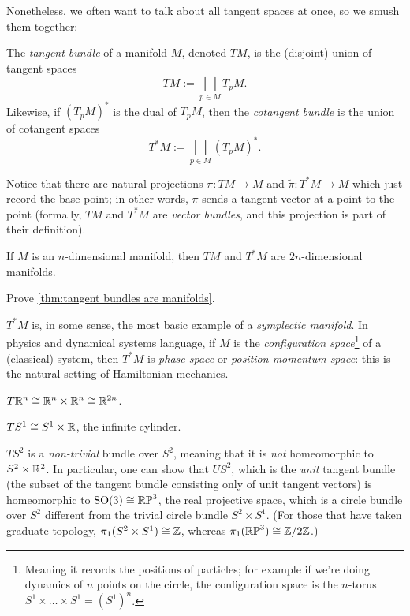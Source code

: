 Nonetheless, we often want to talk about all tangent spaces at once, so we smush them together:

\begin{definition}\label{def:tangent bundle}
	The \emph{tangent bundle} of a manifold $M$, denoted $TM$, is the (disjoint) union of tangent spaces
	\[
		TM := \bigsqcup_{p \in M} T_p M.
	\]
	Likewise, if $(T_pM)^\ast$ is the dual of $T_pM$, then the \emph{cotangent bundle} is the union of cotangent spaces
	\[
		T^\ast M := \bigsqcup_{p \in M} (T_pM)^\ast.
	\]
\end{definition}

Notice that there are natural projections $\pi: TM \to M$ and $\widetilde{\pi}: T^\ast M \to M$ which just record the base point; in other words, $\pi$ sends a tangent vector at a point to the point (formally, $TM$ and $T^\ast M$ are \emph{vector bundles}, and this projection is part of their definition).

\begin{theorem}\label{thm:tangent bundles are manifolds}
	If $M$ is an $n$-dimensional manifold, then $TM$ and $T^\ast M$ are $2n$-dimensional manifolds.
\end{theorem}

\begin{exercise}
	Prove \cref{thm:tangent bundles are manifolds}.
\end{exercise}

$T^\ast M$ is, in some sense, the most basic example of a \emph{symplectic manifold}. In physics and dynamical systems language, if $M$ is the \emph{configuration space}\footnote{Meaning it records the positions of particles; for example if we're doing dynamics of $n$ points on the circle, the configuration space is the $n$-torus $S^1 \times \dots \times S^1 = (S^1)^n$.} of a (classical) system, then $T^\ast M$ is \emph{phase space} or \emph{position-momentum space}: this is the natural setting of Hamiltonian mechanics.

\begin{example}
	$T \mathbb{R}^n \cong \mathbb{R}^n \times \mathbb{R}^n \cong \mathbb{R}^{2n}$.
\end{example}

\begin{example}
	$T S^1 \cong S^1 \times \mathbb{R}$, the infinite cylinder.
\end{example}

\begin{example}
	$TS^2$ is a \emph{non-trivial} bundle over $S^2$, meaning that it is \emph{not} homeomorphic to $S^2 \times \mathbb{R}^2$. In particular, one can show that $US^2$, which is the \emph{unit} tangent bundle (the subset of the tangent bundle consisting only of unit tangent vectors) is homeomorphic to $\operatorname{SO}(3) \cong \mathbb{RP}^3$, the real projective space, which is a circle bundle over $S^2$ different from the trivial circle bundle $S^2 \times S^1$. (For those that have taken graduate topology, $\pi_1(S^2 \times S^1) \cong \mathbb{Z}$, whereas $\pi_1(\mathbb{RP}^3) \cong \mathbb{Z}/2\mathbb{Z}$.)
\end{example}